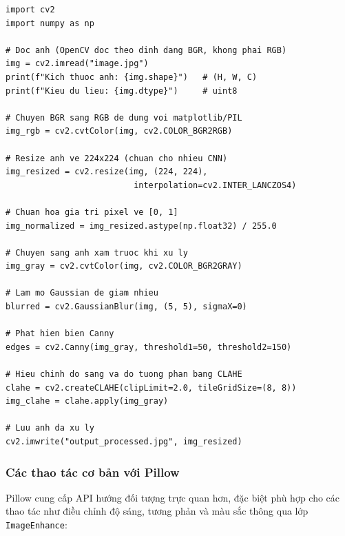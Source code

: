 \begin{verbatim}
import cv2
import numpy as np

# Doc anh (OpenCV doc theo dinh dang BGR, khong phai RGB)
img = cv2.imread("image.jpg")
print(f"Kich thuoc anh: {img.shape}")   # (H, W, C)
print(f"Kieu du lieu: {img.dtype}")     # uint8

# Chuyen BGR sang RGB de dung voi matplotlib/PIL
img_rgb = cv2.cvtColor(img, cv2.COLOR_BGR2RGB)

# Resize anh ve 224x224 (chuan cho nhieu CNN)
img_resized = cv2.resize(img, (224, 224),
                          interpolation=cv2.INTER_LANCZOS4)

# Chuan hoa gia tri pixel ve [0, 1]
img_normalized = img_resized.astype(np.float32) / 255.0

# Chuyen sang anh xam truoc khi xu ly
img_gray = cv2.cvtColor(img, cv2.COLOR_BGR2GRAY)

# Lam mo Gaussian de giam nhieu
blurred = cv2.GaussianBlur(img, (5, 5), sigmaX=0)

# Phat hien bien Canny
edges = cv2.Canny(img_gray, threshold1=50, threshold2=150)

# Hieu chinh do sang va do tuong phan bang CLAHE
clahe = cv2.createCLAHE(clipLimit=2.0, tileGridSize=(8, 8))
img_clahe = clahe.apply(img_gray)

# Luu anh da xu ly
cv2.imwrite("output_processed.jpg", img_resized)
\end{verbatim}

\subsubsection{Các thao tác cơ bản với Pillow}

Pillow cung cấp API hướng đối tượng trực quan hơn, đặc biệt phù hợp cho các thao tác như điều chỉnh độ sáng, tương phản và màu sắc thông qua lớp \texttt{ImageEnhance}:

